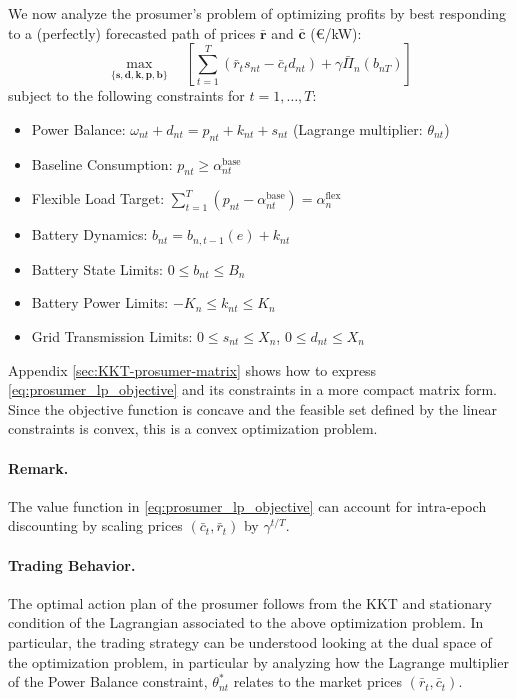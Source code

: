 \documentclass[12pt, notitlepage]{article}
\begin{document}
We now analyze the prosumer's problem of optimizing profits by best responding to a (perfectly) forecasted  path of prices $\bar{\mathbf{r}}$ and $\bar{\mathbf{c}}$ (€/kW):
\begin{equation}
\max_{\{\mathbf{s}, \mathbf{d}, \mathbf{k}, \mathbf{p}, \mathbf{b}\}} \quad \left[ \sum_{t=1}^{T} (\bar{r}_t s_{nt} - \bar{c}_t d_{nt}) + \gamma \bar{\Pi}_n(b_{nT}) \right]
\label{eq:prosumer_lp_objective}
\end{equation}
subject to the following constraints for $t=1, \dots, T$:
\bigskip

\begin{itemize}[itemsep=1pt, topsep=2pt, labelwidth=!, labelindent=0pt, leftmargin=*]
    \item Power Balance: $\omega_{nt} + d_{nt} = p_{nt} + k_{nt} + s_{nt}$ \hfill (Lagrange multiplier: $\theta_{nt}$)
    \item Baseline Consumption: $p_{nt} \ge \alpha^{\text{base}}_{nt}$ \hfill 
    \item Flexible Load Target: $\sum_{t=1}^{T} (p_{nt} - \alpha^{\text{base}}_{nt}) = \alpha^{\text{flex}}_{n}$ \hfill 
    \item Battery Dynamics: $b_{nt} = b_{n,t-1}(e) + k_{nt}$ \hfill
    \item Battery State Limits: $0 \le b_{nt} \le B_n$ \hfill
    \item Battery Power Limits: $-K_n \le k_{nt} \le K_n$ \hfill 
    \item Grid Transmission Limits: $0 \le s_{nt} \le X_n$, $0 \le d_{nt} \le X_n$ \hfill 
\end{itemize}

\bigskip 

\noindent{}Appendix \ref{sec:KKT-prosumer-matrix} shows how to express \cref{eq:prosumer_lp_objective} and its constraints in a more compact matrix form. Since the objective function is concave and the feasible set defined by the linear constraints is convex, this is a convex optimization problem. 

\paragraph{Remark.} The value function in \cref{eq:prosumer_lp_objective} can account for intra-epoch discounting by scaling prices $(\bar{c}_t,\bar{r}_t)$ by $\gamma^{t/T}$.


\paragraph{Trading Behavior.} The optimal action plan of the prosumer follows from the KKT and stationary condition of the Lagrangian associated to the above optimization problem. In particular, the trading strategy can be understood looking at the dual space of the optimization problem, in particular by analyzing how the Lagrange multiplier of the Power Balance constraint, $\theta^*_{nt}$ relates to the market prices $(\bar{r}_t, \bar{c}_t)$. 
\end{document}
